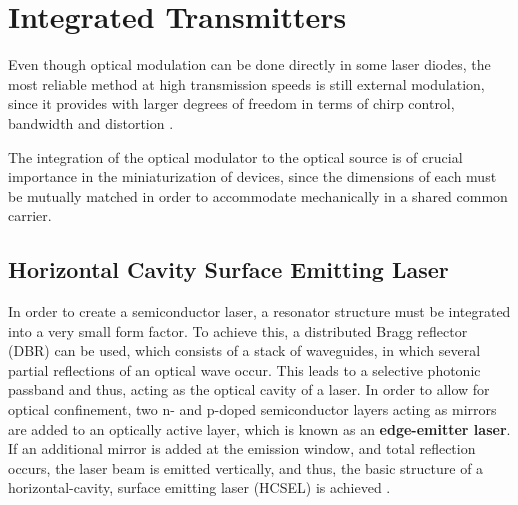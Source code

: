 \section{Integrated Transmitters}

Even though optical modulation can be done directly in some laser diodes, the most reliable method at high transmission speeds is still external modulation, since it provides with larger degrees of freedom in terms of chirp control, bandwidth and distortion \cite{WootenLiNBo300}. 

The integration of the optical modulator to the optical source is of crucial importance in the miniaturization of devices, since the dimensions of each must be mutually matched in order to accommodate mechanically in a shared common carrier. 

\subsection{Horizontal Cavity Surface Emitting Laser} 

In order to create a semiconductor laser, a resonator structure must be integrated into a very small form factor. To achieve this, a distributed Bragg reflector (DBR) can be used, which consists of a stack of waveguides, in which several partial reflections of an optical wave occur. This leads to a selective photonic passband and thus, acting as the optical cavity of a laser. In order to allow for optical confinement, two n- and p-doped semiconductor layers acting as mirrors are added to an optically active layer, which is known as an \textbf{edge-emitter laser}. If an additional mirror is added at the emission window, and total reflection occurs, the laser beam is emitted vertically, and thus, the basic structure of a horizontal-cavity, surface emitting laser (HCSEL) is achieved \cite{Eichlerlaser15}. %


